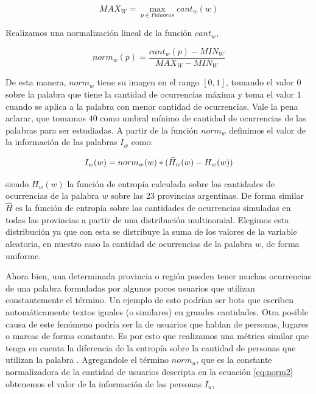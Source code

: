 \begin{equation}
  MAX_W = \max\limits_{p \in Palabras} cant_w(w)
\end{equation}

Realizamos una normalización lineal de la función $cant_w$, 

\begin{equation}
norm_{w}(p) = \frac{cant_w(p)- MIN_W }{MAX_W - MIN_W}
\label{eq:norm1}
\end{equation}

De esta manera, $norm_w$ tiene su imagen en el rango $[0,1]$, tomando el valor $0$ sobre la palabra que tiene la cantidad de ocurrencias máxima y toma el valor $1$ cuando se aplica a la palabra con menor cantidad de ocurrencias. Vale la pena aclarar, que tomamos $40$ como umbral mínimo de cantidad de ocurrencias de las palabras para ser estudiadas.
A partir de la función $norm_w$ definimos el valor de la información de las palabras $I_w$ como:

\begin{equation}
I_w(w) = norm_{w}(w) * (\widehat{H}_{w}(w) - H_{w}(w)) \\
\label{eq:iw}
\end{equation}

siendo $H_w(w)$ la función de entropía calculada sobre las cantidades de ocurrencias de la palabra $w$ sobre las 23 provincias argentinas. De forma similar $\widehat{H}$ es la función de entropía sobre las cantidades de ocurrencias simuladas en todas las provincias a partir de una distribución multinomial. Elegimos esta distribución ya que con esta se distribuye la suma de los valores de la variable aleatoria, en nuestro caso la cantidad de ocurrencias de la palabra $w$, de forma uniforme.%

Ahora bien, una determinada provincia o región pueden tener muchas ocurrencias de una palabra formuladas por algunos pocos usuarios que utilizan constantemente el término. Un ejemplo de esto podrían ser bots que escriben automáticamente textos iguales (o similares) en grandes cantidades. Otra posible causa de este fenómeno podría ser la de usuarios que hablan de personas, lugares o marcas de forma constante.
Es por esto que realizamos una métrica similar que tenga en cuenta la diferencia de la entropía sobre la cantidad de personas que utilizan la palabra . Agregandole el término $norm_u$, que es la constante normalizadora de la cantidad de usuarios descripta en la ecuación \ref{eq:norm2} obtenemos el valor de la información de las personas $I_u$,

